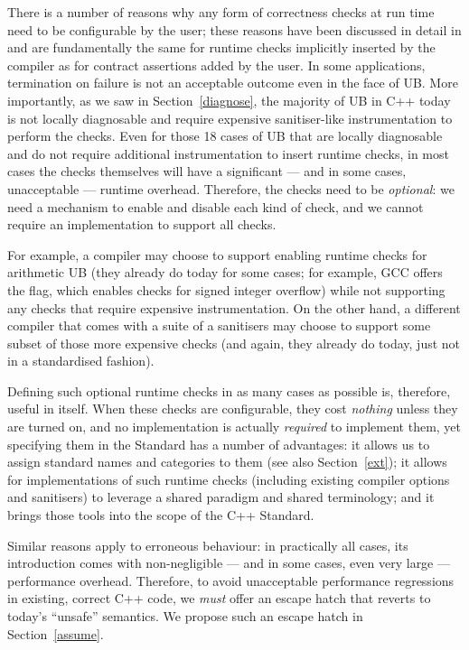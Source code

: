 There is a number of reasons why any form of correctness checks at run time need to be configurable by the user; these reasons have been discussed in detail in \cite{P2900R14} and are fundamentally the same for runtime checks implicitly inserted by the compiler as for contract assertions added by the user. In some applications, termination on failure is not an acceptable outcome even in the face of UB. More importantly, as we saw in Section~\ref{diagnose}, the majority of UB in C++ today is not locally diagnosable and require expensive sanitiser-like instrumentation to perform the checks. Even for those 18 cases of UB that are locally diagnosable and do not require additional instrumentation to insert runtime checks, in most cases the checks themselves will have a significant --- and in some cases, unacceptable --- runtime overhead. Therefore, the checks need to be \emph{optional}: we need a mechanism to enable and disable each kind of check, and we cannot require an implementation to support all checks.

For example, a compiler may choose to support enabling runtime checks for arithmetic UB (they already do today for some cases; for example, GCC offers the  flag, which enables checks for signed integer overflow) while not supporting any checks that require expensive instrumentation. On the other hand, a different compiler that comes with a suite of a sanitisers may choose to support some subset of those more expensive checks (and again, they already do today, just not in a standardised fashion).

Defining such optional runtime checks in as many cases as possible is, therefore, useful in itself. When these checks are configurable, they cost \emph{nothing} unless they are turned on, and no implementation is actually \emph{required} to implement them, yet specifying them in the Standard has a number of advantages: it allows us to assign standard names and categories to them (see also Section~\ref{ext}); it allows for implementations of such runtime checks (including existing compiler options and sanitisers) to leverage a shared paradigm and shared terminology; and it brings those tools into the scope of the C++ Standard.

Similar reasons apply to erroneous behaviour: in practically all cases, its introduction comes with non-negligible --- and in some cases, even very large --- performance overhead. Therefore, to avoid unacceptable performance regressions in existing, correct C++ code, we \emph{must} offer an escape hatch that reverts to today's ``unsafe'' semantics. We propose such an escape hatch in Section~\ref{assume}.

